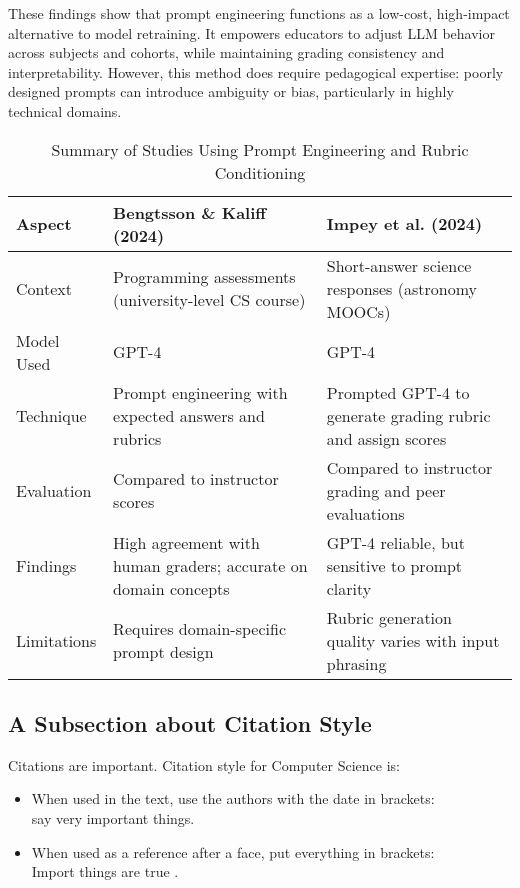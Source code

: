 \documentclass[a4paper,twoside,12pt]{report}
\begin{document}
These findings show that prompt engineering functions as a low-cost, high-impact alternative to model retraining. It empowers educators to adjust LLM behavior across subjects and cohorts, while maintaining grading consistency and interpretability. However, this method does require pedagogical expertise: poorly designed prompts can introduce ambiguity or bias, particularly in highly technical domains.
\begin{table}[h!]
  \centering
  \begin{tabular}{|p{4cm}|p{6.5cm}|p{6.5cm}|}
  \hline
  \textbf{Aspect} & \textbf{Bengtsson \& Kaliff (2024)} & \textbf{Impey et al. (2024)} \\
  \hline
  Context & Programming assessments (university-level CS course) & Short-answer science responses (astronomy MOOCs) \\
  \hline
  Model Used & GPT-4 & GPT-4 \\
  \hline
  Technique & Prompt engineering with expected answers and rubrics & Prompted GPT-4 to generate grading rubric and assign scores \\
  \hline
  Evaluation & Compared to instructor scores & Compared to instructor grading and peer evaluations \\
  \hline
  Findings & High agreement with human graders; accurate on domain concepts & GPT-4 reliable, but sensitive to prompt clarity \\
  \hline
  Limitations & Requires domain-specific prompt design & Rubric generation quality varies with input phrasing \\
  \hline
  \end{tabular}
  \caption{Summary of Studies Using Prompt Engineering and Rubric Conditioning}
  \label{tab:prompt_rubric_conditioning}
  \end{table}
  














\subsection{A Subsection about Citation Style}
Citations are important. Citation style for Computer Science is:
\begin{itemize}
\item When used in the text, use the authors with the date in brackets:\\ \citet{klein17} say very important things.
\item When used as a reference after a face, put everything in brackets:\\ Import things are true \citep{klein17}.
\end{itemize}
\end{document}
